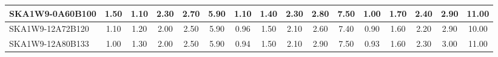 \begin{table}[H]
{{\begin{tabular}{|lccccc||ccccc||ccccc|}
SKA1W9-0A60B100 & 1.50 \cellcolor{blue!44.25} & 1.10 \cellcolor{red!26.67} & 2.30 \cellcolor{green!60.00} & 2.70 \cellcolor{orange!60.00} & 5.90 \cellcolor{purple!60.00} & 1.10 \cellcolor{blue!32.61} & 1.40 \cellcolor{red!43.20} & 2.30 \cellcolor{green!60.00} & 2.80 \cellcolor{orange!49.50} & 7.50 \cellcolor{purple!60.00} & 1.00 \cellcolor{blue!26.40} & 1.70 \cellcolor{red!60.00} & 2.40 \cellcolor{green!60.00} & 2.90 \cellcolor{orange!53.00} & 11.00 \cellcolor{purple!60.00}\\ \hline 
SKA1W9-12A72B120 & 1.10 \cellcolor{blue!23.25} & 1.20 \cellcolor{red!33.33} & 2.00 \cellcolor{green!18.00} & 2.50 \cellcolor{orange!32.00} & 5.90 \cellcolor{purple!60.00} & 0.96 \cellcolor{blue!19.83} & 1.50 \cellcolor{red!51.60} & 2.10 \cellcolor{green!32.00} & 2.60 \cellcolor{orange!28.50} & 7.40 \cellcolor{purple!49.50} & 0.90 \cellcolor{blue!18.00} & 1.60 \cellcolor{red!46.00} & 2.20 \cellcolor{green!39.00} & 2.90 \cellcolor{orange!53.00} & 10.00 \cellcolor{purple!18.00}\\ \hline 
SKA1W9-12A80B133 & 1.00 \cellcolor{blue!18.00} & 1.30 \cellcolor{red!40.00} & 2.00 \cellcolor{green!18.00} & 2.50 \cellcolor{orange!32.00} & 5.90 \cellcolor{purple!60.00} & 0.94 \cellcolor{blue!18.00} & 1.50 \cellcolor{red!51.60} & 2.10 \cellcolor{green!32.00} & 2.90 \cellcolor{orange!60.00} & 7.50 \cellcolor{purple!60.00} & 0.93 \cellcolor{blue!20.52} & 1.60 \cellcolor{red!46.00} & 2.30 \cellcolor{green!49.50} & 3.00 \cellcolor{orange!60.00} & 11.00 \cellcolor{purple!60.00}\\ \hline 
\end{tabular}}
\vspace{-0.300000cm}
\hspace{1cm} 
}
\end{table}
